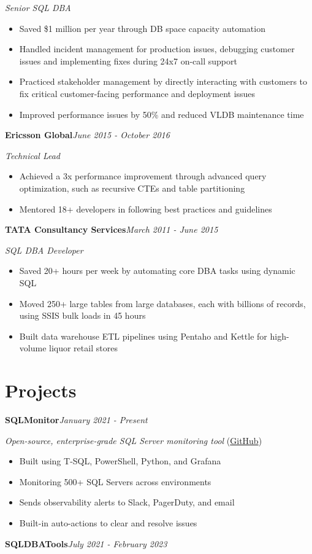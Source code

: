 \documentclass[10pt,a4paper]{article}
\begin{document}
\textit{Senior SQL DBA}\\[-5pt]
\begin{itemize}
  \item Saved \$1 million per year through DB space capacity automation
  \item Handled incident management for production issues, debugging customer issues and implementing fixes during 24x7 on-call support
  \item Practiced stakeholder management by directly interacting with customers to fix critical customer-facing performance and deployment issues
  \item Improved performance issues by 50\% and reduced VLDB maintenance time
\end{itemize}
\vspace{14.7pt}
\noindent\textbf{Ericsson Global}\hfill \textit{June 2015 - October 2016}

\textit{Technical Lead}\\[-5pt]
\begin{itemize}
  \item Achieved a 3x performance improvement through advanced query optimization, such as recursive CTEs and table partitioning
  \item Mentored 18+ developers in following best practices and guidelines
\end{itemize}
\vspace{14.7pt}
\noindent\textbf{TATA Consultancy Services}\hfill \textit{March 2011 - June 2015}

\textit{SQL DBA Developer}\\[-5pt]
\begin{itemize}
  \item Saved 20+ hours per week by automating core DBA tasks using dynamic SQL
  \item Moved 250+ large tables from large databases, each with billions of records, using SSIS bulk loads in 45 hours
  \item Built data warehouse ETL pipelines using Pentaho and Kettle for high-volume liquor retail stores
\end{itemize}

\section{Projects}

\noindent\textbf{SQLMonitor}\hfill \textit{January 2021 - Present}

\textit{Open-source, enterprise-grade SQL Server monitoring tool} (\href{https://github.com/imajaydwivedi/SQLMonitor}{GitHub})
\begin{itemize}
  \item Built using T-SQL, PowerShell, Python, and Grafana
  \item Monitoring 500+ SQL Servers across environments
  \item Sends observability alerts to Slack, PagerDuty, and email
  \item Built-in auto-actions to clear and resolve issues
\end{itemize}
\vspace{14.7pt}
\noindent\textbf{SQLDBATools}\hfill \textit{July 2021 - February 2023}
\end{document}
